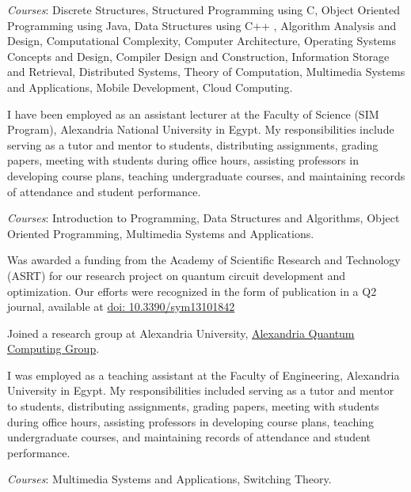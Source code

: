 \documentclass[margin,line]{resume}
\newcommand*{\doi}[1]{\href{http://dx.doi.org/#1}{doi: #1}}
\begin{document}
\begin{resume}
\begin{description}
		      \emph{Courses}: Discrete Structures, Structured Programming using C, Object Oriented Programming using Java, Data Structures using C++ , Algorithm Analysis and Design, Computational Complexity, Computer Architecture, Operating Systems Concepts and Design, Compiler Design and Construction, Information Storage and Retrieval, Distributed Systems, Theory of Computation, Multimedia Systems and Applications, Mobile Development, Cloud Computing.

		\item[2021 Match $\rightarrow$ 2025 June] I have been employed as an assistant lecturer at the Faculty of Science (SIM Program), Alexandria National University in Egypt. My responsibilities include serving as a tutor and mentor to students, distributing assignments, grading papers, meeting with students during office hours, assisting professors in developing course plans, teaching undergraduate courses, and maintaining records of attendance and student performance.

		      \emph{Courses}: Introduction to Programming, Data Structures and Algorithms, Object Oriented Programming, Multimedia Systems and Applications.


		\item[2020 March $\rightarrow$ 2022] Was awarded a funding from the Academy of Scientific Research and Technology (ASRT) for our research project on quantum circuit development and optimization. Our efforts were recognized in the form of publication in a Q2 journal, available at \doi{10.3390/sym13101842}

		\item[2017 July $\rightarrow$ December 2020 ]  Joined a research group at Alexandria University, \href{http://www.sci.p.alexu.edu.eg/~aleqcg/index.html}{Alexandria Quantum Computing Group}.




		\item[2015 February $\rightarrow$ 2018 July]  I was employed as a teaching assistant at the Faculty of Engineering, Alexandria University in Egypt. My responsibilities included serving as a tutor and mentor to students, distributing assignments, grading papers, meeting with students during office hours, assisting professors in developing course plans, teaching undergraduate courses, and maintaining records of attendance and student performance.

		      \emph{Courses}: Multimedia Systems and Applications, Switching Theory.

	\end{description}




\end{resume}
\end{document}
